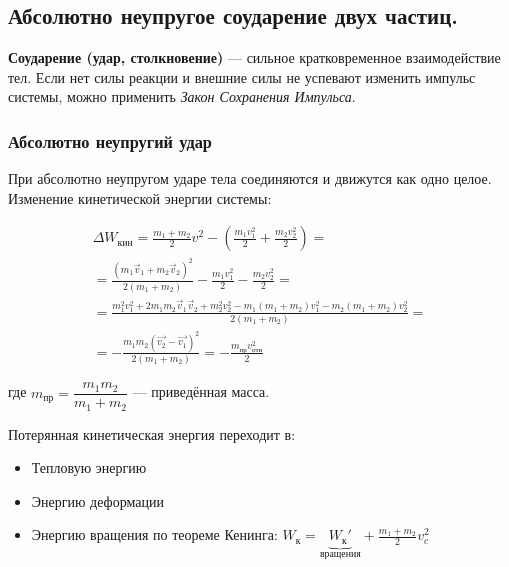 \subsection{Абсолютно неупругое соударение двух частиц.}
\textbf{Соударение (удар, столкновение)} — сильное кратковременное взаимодействие тел. Если нет силы реакции и внешние силы не успевают изменить импульс системы, можно применить \textit{Закон Сохранения Импульса}.

\begin{center}
\end{center}

\subsubsection{Абсолютно неупругий удар}

При абсолютно неупругом ударе тела соединяются и движутся как одно целое. Изменение кинетической энергии системы:

\begin{multline*}
	\Delta W_\text{кин} = \frac{m_1 + m_2}{2} v^2 - \left(\frac{m_1 v_1^2}{2} + \frac{m_2 v_2^2}{2}\right) = \\
	= \frac{(m_1 \vec{v}_1 + m_2 \vec{v}_2)^2}{2(m_1 + m_2)} - \frac{m_1 v_1^2}{2} - \frac{m_2 v_2^2}{2} = \\
	= \frac{m_1^2 v_1^2 + 2m_1m_2\vec{v}_1\vec{v}_2 + m_2^2v_2^2 - m_1(m_1 + m_2)v_1^2 - m_2(m_1 + m_2)v_2^2}{2(m_1 + m_2)} = \\
	= -\frac{m_1m_2(\vec{v_2} - \vec{v_1})^2}{2(m_1 + m_2)} = -\frac{m_{\text{пр}} v_{\text{отн}}^2}{2}
\end{multline*}

где $m_\text{пр} = \dfrac{m_1m_2}{m_1 + m_2}$ — приведённая масса.

Потерянная кинетическая энергия переходит в:
\begin{itemize}
	\item Тепловую энергию
	\item Энергию деформации
	\item Энергию вращения по теореме Кенинга: $W_\text{к} = \underbrace{W_\text{к}'}_\text{вращения} + \frac{m_1 + m_2}{2} v_c^2$
\end{itemize}

